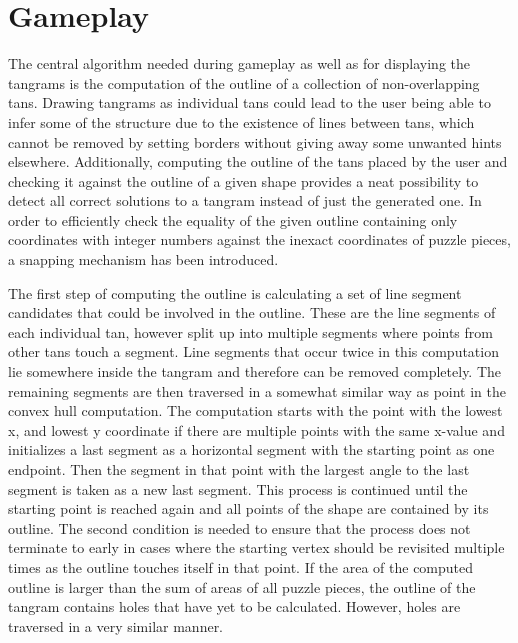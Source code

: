 \section{Gameplay}

The central algorithm needed during gameplay as well as for displaying the tangrams is the computation of the outline of a collection of non-overlapping tans. Drawing tangrams as individual tans could lead to the user being able to infer some of the structure due to the existence of lines between tans, which cannot be removed by setting borders without giving away some unwanted hints elsewhere. Additionally, computing the outline of the tans placed by the user and checking it against the outline of a given shape provides a neat possibility to detect all correct solutions to a tangram instead of just the generated one. In order to efficiently check the equality of the given outline containing only coordinates with integer numbers against the inexact coordinates of puzzle pieces, a snapping mechanism has been introduced.

The first step of computing the outline is calculating a set of line segment candidates that could be involved in the outline. These are the line segments of each individual tan, however split up into multiple segments where points from other tans touch a segment. Line segments that occur twice in this computation lie somewhere inside the tangram and therefore can be removed completely. The remaining segments are then traversed in a somewhat similar way as point in the convex hull computation. The computation starts with the point with the lowest x, and lowest y coordinate if there are multiple points with the same x-value and initializes a last segment as a horizontal segment with the starting point as one endpoint. Then the segment in that point with the largest angle to the last segment is taken as a new last segment. This process is continued until the starting point is reached again and all points of the shape are contained by its outline. The second condition is needed to ensure that the process does not terminate to early in cases where the starting vertex should be revisited multiple times as the outline touches itself in that point. If the area of the computed outline is larger than the sum of areas of all puzzle pieces, the outline of the tangram contains holes that have yet to be calculated. However, holes are traversed in a very similar manner.
 \label{outline}

